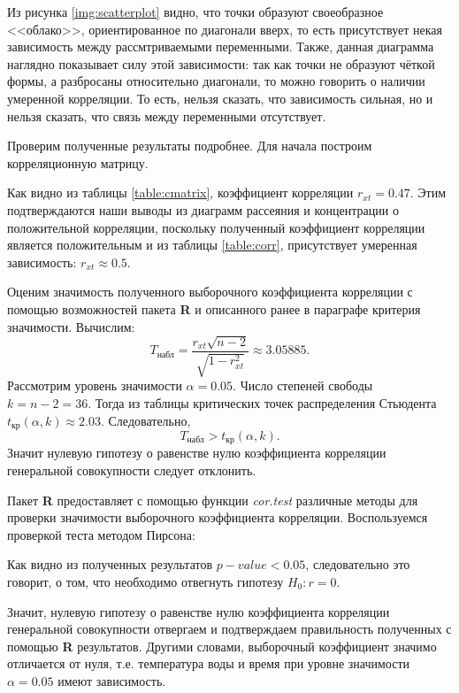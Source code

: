 Из рисунка \ref{img:scatterplot} видно, что точки образуют своеобразное <<облако>>, ориентированное по диагонали вверх, то есть присутствует некая зависимость между рассмтриваемыми переменными. Также, данная диаграмма наглядно показывает силу этой зависимости: так как точки не образуют чёткой формы, а разбросаны относительно диагонали, то можно говорить о наличии умеренной корреляции. То есть, нельзя сказать, что зависимость сильная, но и нельзя сказать, что связь между переменными отсутствует.

Проверим полученные результаты подробнее. Для начала построим корреляционную матрицу.

Как видно из таблицы \ref{table:cmatrix}, коэффициент корреляции $r_{xt} = 0.47$. Этим подтверждаются наши выводы из диаграмм рассеяния и концентрации о положительной корреляции, поскольку полученный коэффициент корреляции является положительным и из таблицы \ref{table:corr}, присутствует умеренная зависимость: $r_{xt} \approx 0.5$. 

Оценим значимость полученного выборочного коэффициента корреляции с помощью возможностей пакета \textbf{R} и описанного ранее в параграфе критерия значимости. Вычислим:
\begin{equation*}
	T_{\textrm{набл}} = \frac{r_{xt} \sqrt{n - 2}}{\sqrt{1 - r_{xt}^2}} \approx 3.05885.
\end{equation*}
Рассмотрим уровень значимости $\alpha = 0.05$. Число степеней свободы $k = n - 2 = 36$. Тогда из таблицы критических точек распределения Стьюдента $t_\textrm{кр}(\alpha, k) \approx 2.03$. Следовательно,
\begin{equation*}
	T_{\textrm{набл}} > t_\textrm{кр}(\alpha, k).
\end{equation*}
Значит нулевую гипотезу о равенстве нулю коэффициента корреляции генеральной совокупности следует отклонить.

Пакет \textbf{R} предоставляет с помощью функции \textit{cor.test} различные методы для проверки значимости выборочного коэффициента корреляции. Воспользуемся проверкой теста методом Пирсона:

Как видно из полученных результатов $p-value < 0.05$, следовательно это говорит, о том, что необходимо отвегнуть гипотезу $H_0: r = 0$.

Значит, нулевую гипотезу о равенстве нулю коэффициента корреляции генеральной совокупности отвергаем и подтверждаем правильность полученных с помощью \textbf{R} результатов. Другими словами, выборочный коэффициент значимо отличается от нуля, т.е. температура воды и время при уровне значимости $\alpha = 0.05$ имеют зависимость.

